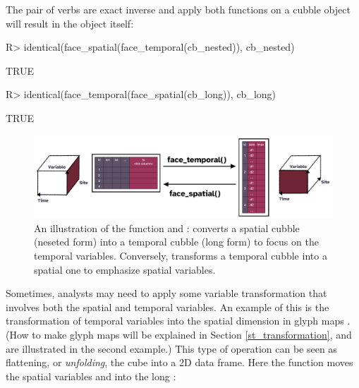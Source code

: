 \documentclass[
  shortnames]{jss}
\begin{document}
The pair of verbs are exact inverse and apply both functions on a cubble object will result in the object itself:

\begin{CodeChunk}
\begin{CodeInput}
R> identical(face_spatial(face_temporal(cb_nested)), cb_nested)
\end{CodeInput}
\begin{CodeOutput}
[1] TRUE
\end{CodeOutput}
\begin{CodeInput}
R> identical(face_temporal(face_spatial(cb_long)), cb_long)
\end{CodeInput}
\begin{CodeOutput}
[1] TRUE
\end{CodeOutput}
\end{CodeChunk}

\begin{CodeChunk}
\begin{figure}

{\centering \includegraphics[width=1\linewidth]{../figures/diagram-keynotes/diagram-keynotes.002} 

}

\caption{An illustration of the function  and :  converts a spatial cubble (neseted form) into a temporal cubble (long form) to focus on the temporal variables. Conversely,  transforms a temporal cubble into a spatial one to emphasize spatial variables.}\label{fig:face}
\end{figure}
\end{CodeChunk}

Sometimes, analysts may need to apply some variable transformation that involves both the spatial and temporal variables. An example of this is the transformation of temporal variables into the spatial dimension in glyph maps \citep{Wickham2012-yr}. (How to make glyph maps will be explained in Section \ref{st_transformation}, and are illustrated in the second example.) This type of operation can be seen as flattening, or \emph{unfolding}, the cube into a 2D data frame. Here the function  moves the spatial variables  and  into the long :
\end{document}
